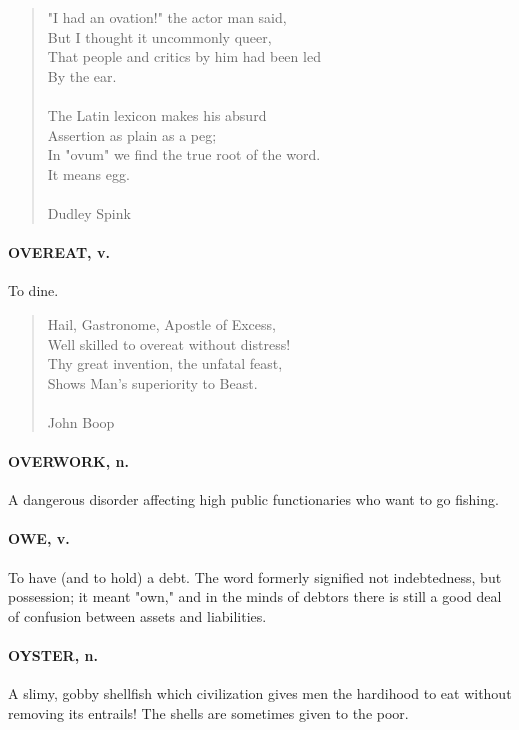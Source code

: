 \documentclass[11pt]{article}
\begin{document}
\begin{quote}   "I had an ovation!" the actor man said, \\
      But I thought it uncommonly queer, \\
  That people and critics by him had been led \\
          By the ear. \\
 \\
  The Latin lexicon makes his absurd \\
      Assertion as plain as a peg; \\
  In "ovum" we find the true root of the word. \\
          It means egg. \\
 \\
Dudley Spink \end{quote}


\paragraph{OVEREAT, v.}  To dine.

\begin{quote}   Hail, Gastronome, Apostle of Excess, \\
  Well skilled to overeat without distress! \\
  Thy great invention, the unfatal feast, \\
  Shows Man's superiority to Beast. \\
 \\
John Boop \end{quote}


\paragraph{OVERWORK, n.}  A dangerous disorder affecting high public functionaries
who want to go fishing.

\paragraph{OWE, v.}  To have (and to hold) a debt.  The word formerly signified
not indebtedness, but possession; it meant "own," and in the minds of
debtors there is still a good deal of confusion between assets and
liabilities.

\paragraph{OYSTER, n.}  A slimy, gobby shellfish which civilization gives men the
hardihood to eat without removing its entrails!  The shells are
sometimes given to the poor.
\end{document}
